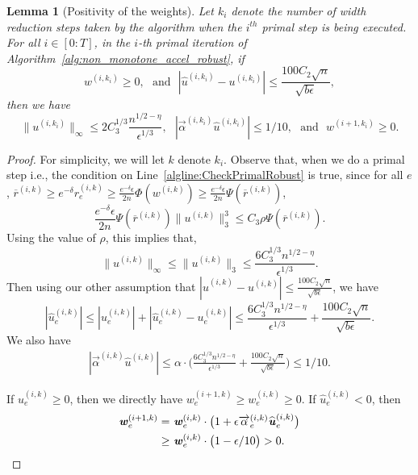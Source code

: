 \documentclass[11pt]{article}
\newtheorem{lemma}[theorem]{Lemma}
\newcommand\rr{\boldsymbol{\mathit{r}}}
\newcommand\uu{\boldsymbol{\mathit{u}}}
\newcommand\ww{\boldsymbol{\mathit{w}}}
\newcommand\rrbar{\overline{\boldsymbol{\mathit{r}}}}
\newcommand{\wh}{\widehat}
\begin{document}
\begin{lemma}[Positivity of the weights]\label{lem:positivity_weights}
Let $k_i$ denote the number of width reduction steps taken by the algorithm when the $i^{th}$ primal step is being executed. For all $i \in [0:T]$, in the $i$-th primal iteration of Algorithm~\ref{alg:non_monotone_accel_robust}, if
\[
\ww^{(i,k_i)} \geq 0, ~~~\text{and}~~~ |\wh{\uu}^{(i,k_i)} - \uu^{(i,k_i)}| \leq \frac{100 C_2 \sqrt{n}}{\sqrt{b \epsilon}},
\]
then we have
\[
\|\uu^{(i,k_i)}\|_{\infty} \leq 2C_3^{1/3}\frac{n^{1/2-\eta}}{\epsilon^{1/3}}, ~~~ |\overrightarrow{\alpha}^{(i,k_i)} \wh{\uu}^{(i,k_i)}| \leq 1 / 10, ~~~\text{and}~~~\ww^{(i+1,k_{i})} \geq 0.
\]
\end{lemma}
\begin{proof}
For simplicity, we will let $k$ denote $k_i$. Observe that, when we do a primal step i.e., the condition on Line~\ref{algline:CheckPrimalRobust} is true, since for all $e$, $\rrbar^{(i,k)}\geq e^{-\delta}\rr^{(i,k)}_e \geq \frac{e^{-\delta}\epsilon}{2n}\Phi(\ww^{(i,k)})\geq \frac{e^{-\delta}\epsilon}{2n}\Psi(\rrbar^{(i,k)})$,
    \[
    \frac{e^{-\delta}\epsilon}{2n}\Psi(\rrbar^{(i,k)})\|\uu^{(i,k)}\|_3^3 \leq C_3 \rho \Psi(\rrbar^{(i,k)}).
    \]
    Using the value of $\rho$, this implies that,
    \[
    \|\uu^{(i,k)}\|_{\infty}
\leq \|\uu^{(i,k)}\|_3 \leq \frac{6C_3^{1/3}n^{1/2-\eta}}{\epsilon^{1/3}}.
    \]
Then using our other assumption that $|\wh{\uu}^{(i,k)} - \uu^{(i,k)}| \leq \frac{100 C_2 \sqrt{n}}{\sqrt{b \epsilon}}$, we have
\begin{equation*}
|\wh{\uu}^{(i,k)}_e| \leq |\uu^{(i,k)}_e| + |\wh{\uu}^{(i,k)}_e - \uu^{(i,k)}_e| \leq \frac{6C_3^{1/3} n^{1/2-\eta}}{\epsilon^{1/3}} + \frac{100 C_2 \sqrt{n}}{\sqrt{b \epsilon}}.
\end{equation*}
We also have
\begin{align*}
|\overrightarrow{\alpha}^{(i,k)} \wh{\uu}^{(i,k)}| \leq \alpha  \cdot \Big( \frac{6C_3^{1/3}n^{1/2-\eta}}{\epsilon^{1/3}} + \frac{100 C_2 \sqrt{n}}{\sqrt{b \epsilon}} \Big) \leq 1/10.
\end{align*}

If $\wh{\uu}^{(i,k)}_e \geq 0$, then we directly have $\ww^{(i+1,k)}_e \geq \ww^{(i,k)}_e \geq 0$.
If $\wh{\uu}^{(i,k)}_e < 0$, then
\begin{align*}
\ww^{(i+1,k)}_e = &~ \ww^{(i,k)}_e \cdot \big(1 + \epsilon \overrightarrow{\alpha}^{(i,k)}_e \wh{\uu}^{(i,k)}_e\big) \\
\geq &~ \ww^{(i,k)}_e \cdot \big(1 - \epsilon/10\big) > 0. \qedhere
\end{align*}
\end{proof}
\end{document}
